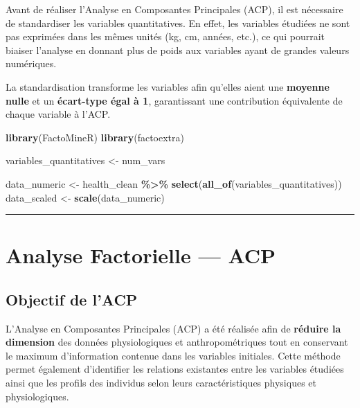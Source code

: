\documentclass[
]{article}
\newenvironment{Shaded}{\begin{snugshade}}{\end{snugshade}}
\newcommand{\FunctionTok}[1]{\textcolor[rgb]{0.13,0.29,0.53}{\textbf{#1}}}
\newcommand{\NormalTok}[1]{#1}
\newcommand{\OtherTok}[1]{\textcolor[rgb]{0.56,0.35,0.01}{#1}}
\newcommand{\SpecialCharTok}[1]{\textcolor[rgb]{0.81,0.36,0.00}{\textbf{#1}}}
\begin{document}
Avant de réaliser l'Analyse en Composantes Principales (ACP), il est
nécessaire de standardiser les variables quantitatives. En effet, les
variables étudiées ne sont pas exprimées dans les mêmes unités (kg, cm,
années, etc.), ce qui pourrait biaiser l'analyse en donnant plus de
poids aux variables ayant de grandes valeurs numériques.

La standardisation transforme les variables afin qu'elles aient une
\textbf{moyenne nulle} et un \textbf{écart-type égal à 1}, garantissant
une contribution équivalente de chaque variable à l'ACP.

\begin{Shaded}
\begin{Highlighting}[]
\FunctionTok{library}\NormalTok{(FactoMineR)}
\FunctionTok{library}\NormalTok{(factoextra)}

\NormalTok{variables\_quantitatives }\OtherTok{\textless{}{-}}\NormalTok{ num\_vars}

\NormalTok{data\_numeric }\OtherTok{\textless{}{-}}\NormalTok{ health\_clean }\SpecialCharTok{\%\textgreater{}\%} \FunctionTok{select}\NormalTok{(}\FunctionTok{all\_of}\NormalTok{(variables\_quantitatives))}
\NormalTok{data\_scaled  }\OtherTok{\textless{}{-}} \FunctionTok{scale}\NormalTok{(data\_numeric)}
\end{Highlighting}
\end{Shaded}

\begin{center}\rule{0.5\linewidth}{0.5pt}\end{center}

\section{Analyse Factorielle --- ACP}\label{analyse-factorielle-acp}

\subsection{Objectif de l'ACP}\label{objectif-de-lacp}

L'Analyse en Composantes Principales (ACP) a été réalisée afin de
\textbf{réduire la dimension} des données physiologiques et
anthropométriques tout en conservant le maximum d'information contenue
dans les variables initiales. Cette méthode permet également
d'identifier les relations existantes entre les variables étudiées ainsi
que les profils des individus selon leurs caractéristiques physiques et
physiologiques.
\end{document}
